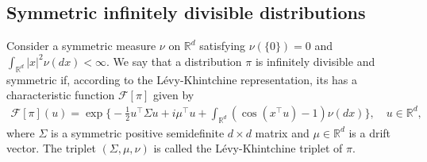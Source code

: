 \documentclass[preprint, 3p, authoryear]{elsarticle}
\theoremstyle{definition}
\begin{document}
\subsection{Symmetric infinitely divisible distributions}
Consider a symmetric measure $\nu$ on $\mathbb{R}^{d}$
satisfying $\nu\left(\{0\}\right)=0$ and $\int_{\mathbb{R}^{d}}\left|x\right|^{2}\nu(dx)<\infty$.
We say that a distribution $\pi$ is infinitely divisible and symmetric if, 
according to the L\'evy-Khintchine representation,
its has a characteristic function $\mathcal{F}[\pi]$ given by 
\begin{align*}
\mathcal{F}[\pi](u)=\exp\biggl\{ -\frac{1}{2} u^{\top} \Sigma u +{i} \mu^{\top}u  +\int_{\mathbb{R}^{d}}\left(\cos\left( x^{\top}u \right)-1\right)\nu(dx)\biggr\} ,\quad u\in\mathbb{R}^{d},
\end{align*}
where $\Sigma$ is a symmetric positive semidefinite $d\times d$ matrix and
$\mu\in\mathbb{R}^{d}$ is a drift vector.
The triplet $\left(\Sigma,\mu,\nu\right)$ is called the L\'evy-Khintchine
triplet of $\pi$.
\end{document}
